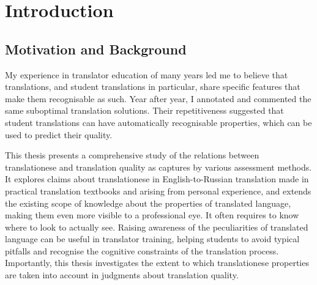 \chapter{\label{cha:intro}Introduction}
%

\section{\label{sec:motivation}Motivation and Background}
My experience in translator education of many years led me to believe that translations, and student translations in particular, share specific features that make them recognisable as such. 
Year after year, I annotated and commented the same suboptimal translation solutions. Their repetitiveness suggested that student translations can have automatically recognisable properties, which can be used to predict their quality. 

This thesis presents a comprehensive study of the relations between translationese and translation quality as captures by various assessment methods.
It explores claims about translationese in English-to-Russian translation made in practical translation textbooks and arising from personal experience, and extends the existing scope of knowledge about the properties of translated language, making them even more visible to a professional eye. It often requires to know where to look to actually see. Raising awareness of the peculiarities of translated language can be useful in translator training, helping students to avoid typical pitfalls and recognise the cognitive constraints of the translation process. Importantly, this thesis investigates the extent to which translationese properties are taken into account in judgments about translation quality.

